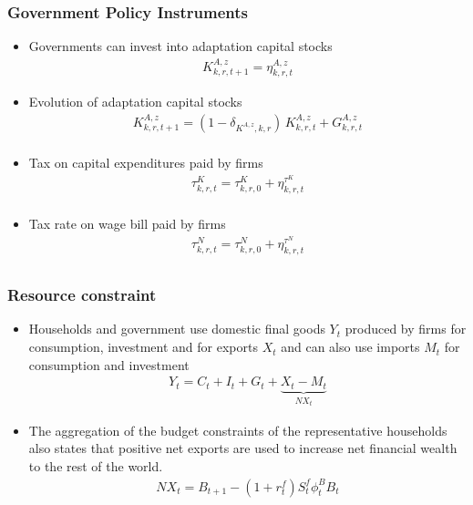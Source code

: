 \documentclass[11pt,aspectratio=169]{beamer}
\begin{document}
\begin{frame}
\frametitle{Government Policy Instruments}
\scriptsize
\begin{itemize}
\item Governments can invest into adaptation capital stocks
\begin{align*}
K^{A,z}_{k,r,t+1} = \eta^{A,z}_{k,r,t}
\end{align*}
\item Evolution of adaptation capital stocks
\begin{align*}
K^{A,z}_{k,r,t+1} = (1 - \delta_{K^{A,z},k,r}) \, K^{A,z}_{k,r,t} + G^{A,z}_{k,r,t} \nonumber \\
\end{align*}
\item Tax on capital expenditures paid by firms
\begin{align*}
\tau^{K}_{k,r,t} = \tau^{K}_{k,r,0} + \eta^{\tau^{K}}_{k,r,t} \nonumber \\
\end{align*}
\item Tax rate on wage bill paid by firms
\begin{align*}
\tau^{N}_{k,r,t} = \tau^{N}_{k,r,0} + \eta^{\tau^{N}}_{k,r,t} \nonumber \\
\end{align*}
\end{itemize}
\end{frame}

\begin{frame}
\frametitle{Resource constraint}
\scriptsize
\begin{itemize}
\item Households and government use domestic final goods $Y_t$ produced by firms for consumption, investment and for exports $X_{t}$ and can also use imports $M_t$ for consumption and investment
\begin{align}
Y_{t} = C_{t} + I_{t} + G_{t} + \underbrace{X_{t} - M_{t}}_{NX_{t}}
\end{align}
\item The aggregation of the budget constraints of the representative households also states that positive net exports are used to increase net financial wealth to the rest of the world.
\begin{align}
NX_t = B_{t+1} - (1 + r^{f}_{t}) S^{f}_{t} \phi^B_{t} B_{t}
\end{align}
\end{itemize}
\end{frame}
\end{document}
